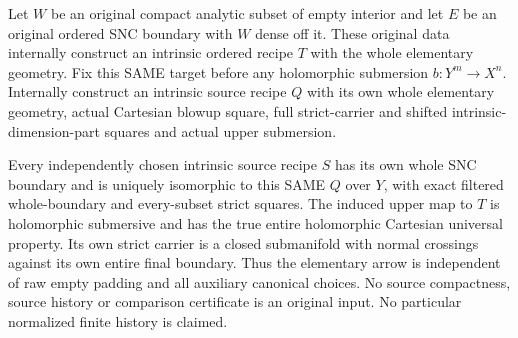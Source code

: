 \begin{theorem}
\label{hir:original-intrinsic-nonpure-elementary-independent-smooth}
\leanok
Let $W$ be an original compact analytic subset of empty interior and
let $E$ be an original ordered SNC boundary with $W$ dense off it.
These original data internally construct an intrinsic ordered recipe
$T$ with the whole elementary geometry. Fix this SAME target before
any holomorphic submersion $b:Y^m\to X^n$. Internally construct an
intrinsic source recipe $Q$ with its own whole elementary geometry,
actual Cartesian blowup square, full strict-carrier and shifted
intrinsic-dimension-part squares and actual upper submersion.

Every independently chosen intrinsic source recipe $S$ has its own
whole SNC boundary and is uniquely isomorphic to this SAME $Q$ over
$Y$, with exact filtered whole-boundary and every-subset strict
squares. The induced upper map to $T$ is holomorphic submersive and
has the true entire holomorphic Cartesian universal property. Its
own strict carrier is a closed submanifold with normal crossings
against its own entire final boundary. Thus the elementary arrow is
independent of raw empty padding and all auxiliary canonical choices.
No source compactness, source history or comparison certificate is
an original input. No particular normalized finite history is claimed.
\end{theorem}
